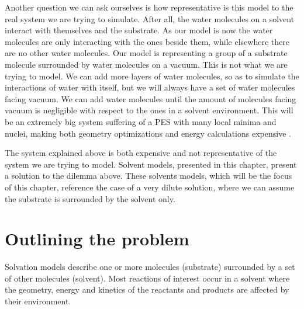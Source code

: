 \documentclass[../Thesis.tex]{subfiles}
\begin{document}
Another question we can ask ourselves is how representative is this model to the
real system we are trying to simulate. After all, the water molecules on a solvent interact
with themselves and the substrate. As our model is now the water molecules are
only interacting with the ones beside them, while elsewhere there are no other water
molecules. Our model is representing a group of a substrate molecule surrounded
by water molecules on a vacuum. This is not what we are trying to model. We can add
more layers of water molecules, so as to simulate the interactions of water with
itself, but we will always have a set of water molecules facing vacuum.
We can add water molecules until the amount of molecules facing vacuum is negligible
with respect to the ones in a solvent environment. This will be an extremely big
system suffering of a \ac{PES} with many local minima and nuclei, making both
geometry optimizations and energy calculations expensive \cite{Jensen:2017}.

The system explained above is both expensive and not representative of the system we are trying
to model. Solvent models, presented in this chapter, present a solution to the dilemma above.
These solvents models, which will be the focus of this chapter, reference the case of a very dilute
solution, where we can assume the substrate is surrounded by the solvent only.

\section{Outlining the problem}
Solvation models describe one or more molecules (substrate) surrounded by
a set of other molecules (solvent). Most reactions of interest occur in a
solvent where the geometry, energy and kinetics of the reactants and products
are affected by their environment\cite{Mennucci:2018}.
\end{document}
